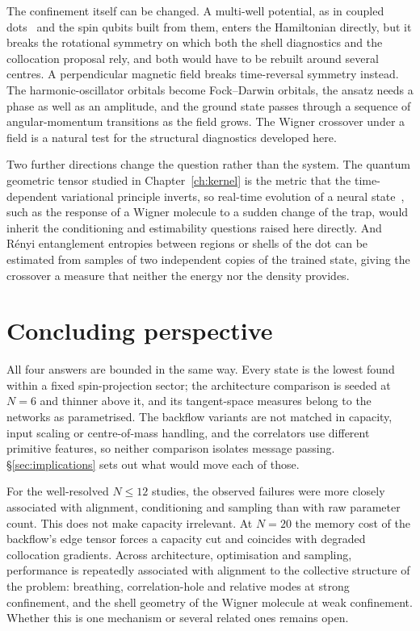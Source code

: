 The confinement itself can be changed. A multi-well potential, as in coupled
dots~\cite{Mariadason2018-DoubleDotHF} and the spin qubits built from them, enters the
Hamiltonian directly, but it breaks the rotational symmetry on which both the shell diagnostics and the
collocation proposal rely, and both would have to be rebuilt around several centres. A
perpendicular magnetic field breaks time-reversal symmetry instead. The harmonic-oscillator
orbitals become Fock--Darwin orbitals, the ansatz needs a phase as well as an amplitude, and
the ground state passes through a sequence of angular-momentum transitions as the field
grows. The Wigner crossover under a field is a natural test
for the structural diagnostics developed here.

Two further directions change the question rather than the system. The quantum geometric
tensor studied in Chapter~\ref{ch:kernel} is the metric that the time-dependent variational
principle inverts, so real-time evolution of a neural state~\cite{Carleo2017-NQS}, such as
the response of a Wigner molecule to a sudden change of the trap, would inherit the
conditioning and estimability questions raised here directly. And Rényi entanglement
entropies between regions or shells of the dot can be estimated from samples of two
independent copies of the trained state, giving the crossover a measure that neither the
energy nor the density provides.

\section{Concluding perspective}

All four answers are bounded in the same way. Every state is the lowest found within a fixed
spin-projection sector; the architecture comparison is seeded at $N{=}6$ and thinner above
it, and its tangent-space measures belong to the networks as parametrised. The backflow
variants are not matched in capacity, input scaling or centre-of-mass handling, and the
correlators use different primitive features, so neither comparison isolates message passing.
\S\ref{sec:implications} sets out what would move
each of those.

For the well-resolved $N\le12$ studies, the observed failures were more closely associated
with alignment, conditioning and sampling than with raw parameter count. This does not make
capacity irrelevant. At $N{=}20$ the memory cost of the backflow's edge tensor forces a
capacity cut and coincides with degraded collocation gradients. Across architecture, optimisation and
sampling, performance is repeatedly associated with alignment to the collective structure of
the problem: breathing, correlation-hole and relative modes at strong confinement, and the
shell geometry of the Wigner molecule at weak confinement. Whether this is one mechanism or
several related ones remains open.

